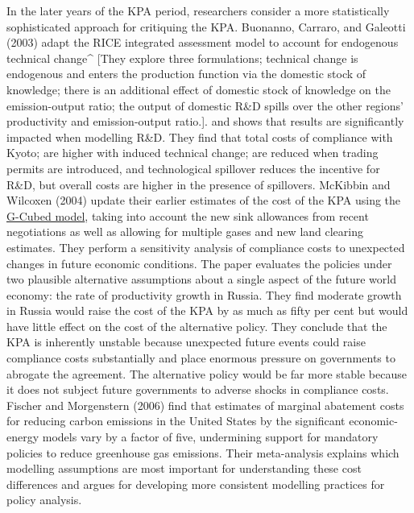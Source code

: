 \documentclass[
  10pt,
]{article}
\begin{document}
In the later years of the KPA period, researchers consider a more
statistically sophisticated approach for critiquing the KPA. Buonanno,
Carraro, and Galeotti (2003) adapt the RICE integrated assessment model
to account for endogenous technical change\^{} {[}They explore three
formulations; technical change is endogenous and enters the production
function via the domestic stock of knowledge; there is an additional
effect of domestic stock of knowledge on the emission-output ratio; the
output of domestic R\&D spills over the other regions' productivity and
emission-output ratio.{]}. and shows that results are significantly
impacted when modelling R\&D. They find that total costs of compliance
with Kyoto; are higher with induced technical change; are reduced when
trading permits are introduced, and technological spillover reduces the
incentive for R\&D, but overall costs are higher in the presence of
spillovers. McKibbin and Wilcoxen (2004) update their earlier estimates
of the cost of the KPA using the
\href{https://unfccc.int/topics/mitigation/workstreams/response-measures/modelling-tools-to-assess-the-impact-of-the-implementation-of-response-measures/response-measures-models-g-cubed}{G-Cubed
model}, taking into account the new sink allowances from recent
negotiations as well as allowing for multiple gases and new land
clearing estimates. They perform a sensitivity analysis of compliance
costs to unexpected changes in future economic conditions. The paper
evaluates the policies under two plausible alternative assumptions about
a single aspect of the future world economy: the rate of productivity
growth in Russia. They find moderate growth in Russia would raise the
cost of the KPA by as much as fifty per cent but would have little
effect on the cost of the alternative policy. They conclude that the KPA
is inherently unstable because unexpected future events could raise
compliance costs substantially and place enormous pressure on
governments to abrogate the agreement. The alternative policy would be
far more stable because it does not subject future governments to
adverse shocks in compliance costs. Fischer and Morgenstern (2006) find
that estimates of marginal abatement costs for reducing carbon emissions
in the United States by the significant economic-energy models vary by a
factor of five, undermining support for mandatory policies to reduce
greenhouse gas emissions. Their meta-analysis explains which modelling
assumptions are most important for understanding these cost differences
and argues for developing more consistent modelling practices for policy
analysis.
\end{document}
